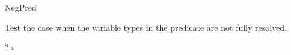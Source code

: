 \begin{zsection}
  \SECTION NegPred
\end{zsection}

Test the case when the variable types in the predicate are not fully 
resolved.
\begin{zed} \vdash? s \in \power \nat \end{zed}
